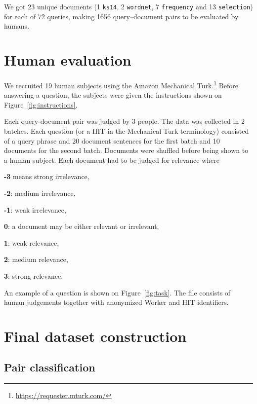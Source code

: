 We got 23 unique documents (1 \texttt{ks14}, 2 \texttt{wordnet}, 7
\texttt{frequency} and 13 \texttt{selection}) for each of 72 queries, making
1656 query--document pairs to be evaluated by humans.

\section{Human evaluation}
\label{sec:human-evaluation}



We recruited 19 human subjects using the Amazon Mechanical Turk.\footnote{\url{https://requester.mturk.com/}} Before answering a question, the subjects were given the instructions shown on Figure~\ref{fig:instructions}.

Each query-document pair was judged by 3 people. The data was collected in 2 batches. Each question (or a HIT in the Mechanical Turk terminology) consisted of a query phrase and 20 document sentences for the first batch and 10 documents for the second batch. Documents were shuffled before being shown to a human subject. Each document had to be judged for relevance where
\begin{compactitem}
\item \textbf{-3} means strong irrelevance,
\item \textbf{-2}: medium irrelevance,
\item \textbf{-1}: weak irrelevance,
\item  \textbf{0}: a document may be either relevant or irrelevant,
\item  \textbf{1}: weak relevance,
\item  \textbf{2}: medium relevance,
\item  \textbf{3}: strong relevance.
\end{compactitem}

An example of a question is shown on Figure~\ref{fig:task}. The  file consists of human judgements together with anonymized Worker and HIT identifiers.



\section{Final dataset construction}
\label{sec:postprocessing}

\subsection{Pair classification}

